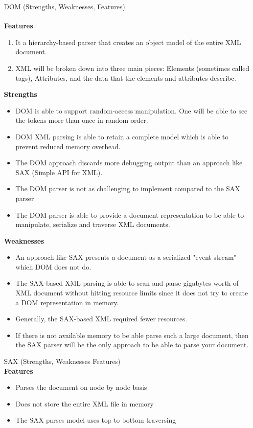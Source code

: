 \documentclass[11pt,english]{article}
\begin{document}
DOM (Strengths, Weaknesses, Features)
\\
\\
	\textbf{Features}
		\begin{enumerate}
			\item It a hierarchy-based parser that creates an object model of the entire XML document.
			\item XML will be broken down into three main pieces: Elements (sometimes called tags), Attributes, and the data that the elements and attributes describe.
		\end{enumerate}
	\textbf{Strengths}
		\begin{itemize}
			\item DOM is able to support random-access manipulation. One will be able to see the tokens more than once in random order. 
			\item DOM XML parsing is able to retain a complete model which is able to prevent reduced memory overhead.
			\item The DOM approach discards more debugging output than an approach like SAX (Simple API for XML).
			\item The DOM parser is not as challenging to implement compared to the SAX parser
			\item The DOM parser is able to provide a document representation to be able to manipulate, serialize and traverse XML documents.
		\end{itemize}
	\textbf{Weaknesses}
		\begin{itemize}
			\item An approach like SAX presents a document as a serialized "event stream" which DOM does not do.
			\item The SAX-based XML parsing is able to scan and parse gigabytes worth of XML document without hitting resource limits since it does not try to create a DOM representation in memory.
			\item Generally, the SAX-based XML required fewer resources.
			\item If there is not available memory to be able parse such a large document, then the SAX parser will be the only approach to be able to parse your document. 
		\end{itemize}
SAX (Strengths, Weaknesses Features)
\\
\textbf{Features}
\begin{itemize}
\item Parses the document on node by node basis
\item Does not store the entire XML file in memory
\item The SAX parses model uses top to bottom traversing
\end{itemize}
\end{document}

